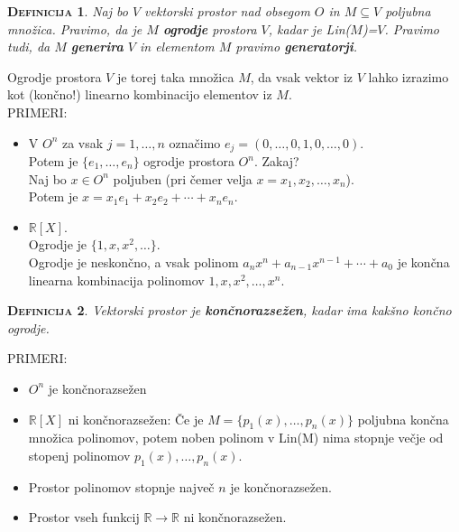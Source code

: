 \documentclass[a4paper,12pt]{article}
\newtheorem*{definicija}{\textsc{Definicija}}
\begin{document}
\begin{definicija}
Naj bo $V$ vektorski prostor nad obsegom $O$ in $M \subseteq V$ poljubna množica. Pravimo, da je $M$ \textbf{ogrodje} prostora $V$, kadar je Lin($M$)=$V$. Pravimo tudi, da $M$ \textbf{generira} $V$ in elementom $M$ pravimo \textbf{generatorji}.\\
\end{definicija}

\noindent Ogrodje prostora $V$ je torej taka množica $M$, da vsak vektor iz $V$ lahko izrazimo kot (končno!) linearno kombinacijo elementov iz $M$. \\

\noindent PRIMERI:
\begin{itemize}
\item V $O^n$ za vsak $j=1,\ldots,n$ označimo $e_j=(0,\ldots,0,1,0,\ldots,0)$. \\

Potem je $\{e_1,\ldots,e_n\}$ ogrodje prostora $O^n$. Zakaj? \\

Naj bo $x\in O^n$ poljuben (pri čemer velja $x=x_1,x_2,\ldots,x_n$). \\

Potem je $x=x_1e_1+x_2e_2+\cdots+x_ne_n$.

\item $\mathbb{R}[X]$. \\

Ogrodje je $\{1,x,x^2,\ldots\}$. \\

Ogrodje je neskončno, a vsak polinom  $a_nx^n+a_{n-1}x^{n-1}+\cdots+a_0$ je končna linearna kombinacija polinomov $1,x,x^2,\ldots,x^n$. \\
\end{itemize}

\begin{definicija}
Vektorski prostor je \textbf{končnorazsežen}, kadar ima kakšno končno ogrodje. \\
\end{definicija}

\noindent PRIMERI:
\begin{itemize}
\item $O^n$ je končnorazsežen
\item $\mathbb{R}[X]$ ni končnorazsežen: Če je $M=\{p_1(x),\ldots,p_n(x)\}$ poljubna končna množica polinomov, potem noben polinom v Lin(M) nima stopnje večje od stopenj polinomov $p_1(x),\ldots,p_n(x)$. 
\item Prostor polinomov stopnje največ $n$ je končnorazsežen.
\item Prostor vseh funkcij $\mathbb{R}\to \mathbb{R}$ ni končnorazsežen.\\
\end{itemize}
\end{document}
